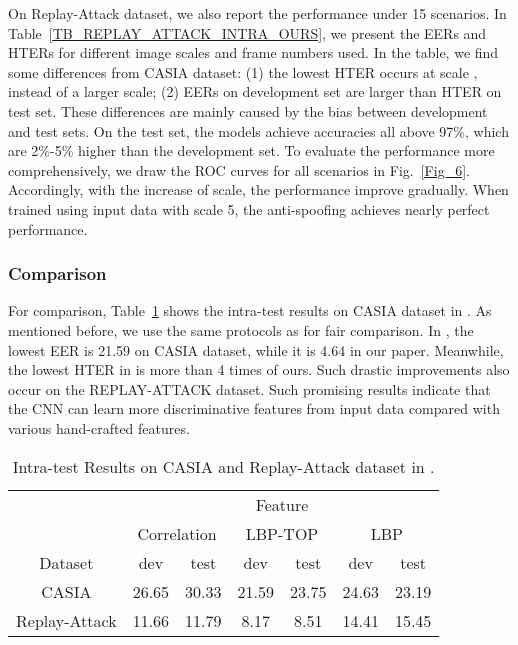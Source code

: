 \documentclass[letterpaper, 10 pt, conference]{ieeeconf}
\begin{document}
On Replay-Attack dataset, we also report the performance under 15 scenarios. In Table~\ref{TB_REPLAY_ATTACK_INTRA_OURS}, we present the EERs and HTERs for different image scales and frame numbers used. In the table, we find some differences from CASIA dataset: (1) the lowest HTER occurs at scale , instead of a larger scale; (2) EERs on development set are larger than HTER on test set. These differences are mainly caused by the bias between development and test sets. On the test set, the models achieve accuracies all above 97\%, which are 2\%-5\% higher than the development set. To evaluate the performance more comprehensively, we draw the ROC curves for all scenarios in Fig.~\ref{Fig_6}. Accordingly, with the increase of scale, the performance improve gradually. When trained using input data with scale 5, the anti-spoofing achieves nearly perfect performance.

\subsubsection{Comparison}

For comparison, Table~\ref{TB_CASIA_INTRA_PREVIOUS} shows the intra-test results on CASIA dataset in \cite{Face_Anti_Spoofing_Pereira_2013}. As mentioned before, we use the same protocols as \cite{Face_Anti_Spoofing_Pereira_2013} for fair comparison. In \cite{Face_Anti_Spoofing_Pereira_2013}, the lowest EER is 21.59 on CASIA dataset, while it is 4.64 in our paper. Meanwhile, the lowest HTER in \cite{Face_Anti_Spoofing_Pereira_2013} is more than 4 times of ours. Such drastic improvements also occur on the REPLAY-ATTACK dataset. Such promising results indicate that the CNN can learn more discriminative features from input data compared with various hand-crafted features.

\begin{table}[!htb]
\caption{Intra-test Results on CASIA and Replay-Attack dataset in \cite{Face_Anti_Spoofing_Pereira_2013}.}
\label{TB_CASIA_INTRA_PREVIOUS}
\centering
\begin{tabular}{|c|c|c|c|c|c|c|}
\cline{2-7}
 \multicolumn{1}{c|}{}      & \multicolumn{6}{c|}{Feature}     \\
       \cline{2-7}
  \multicolumn{1}{c|}{}     & \multicolumn{2}{c|}{Correlation} & \multicolumn{2}{c|}{LBP-TOP} & \multicolumn{2}{c|}{LBP} \\
\hline
Dataset       & dev & test & dev & test & dev & test \\
       \hline
CASIA   & 26.65 & 30.33 & 21.59 & 23.75 & 24.63 & 23.19 \\
\hline
Replay-Attack  & 11.66 & 11.79 & 8.17 & 8.51 & 14.41 & 15.45 \\
\hline
\end{tabular}
\end{table}
\end{document}
